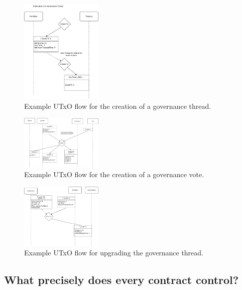\documentclass[11pt]{article}
\begin{document}
\begin{figure}
    \centering
    \includegraphics[width=0.35\textwidth]{figures/init-gov-thread.pdf}
    \caption{Example UTxO flow for the creation of a governance thread.}
    \label{fig:utxo-flow-gov-thread-init}
\end{figure}

\begin{figure}
    \centering
    \includegraphics[width=0.35\textwidth]{figures/init-vote.pdf}
    \caption{Example UTxO flow for the creation of a governance vote.}
    \label{fig:utxo-flow-vote-init}
\end{figure}

\begin{figure}
    \centering
    \includegraphics[width=0.35\textwidth]{figures/upgrade-gov-thread.pdf}
    \caption{Example UTxO flow for upgrading the governance thread.}
    \label{fig:utxo-flow-gov-thread-upgrade}
\end{figure}


\subsection{What precisely does every contract control?}
\end{document}
